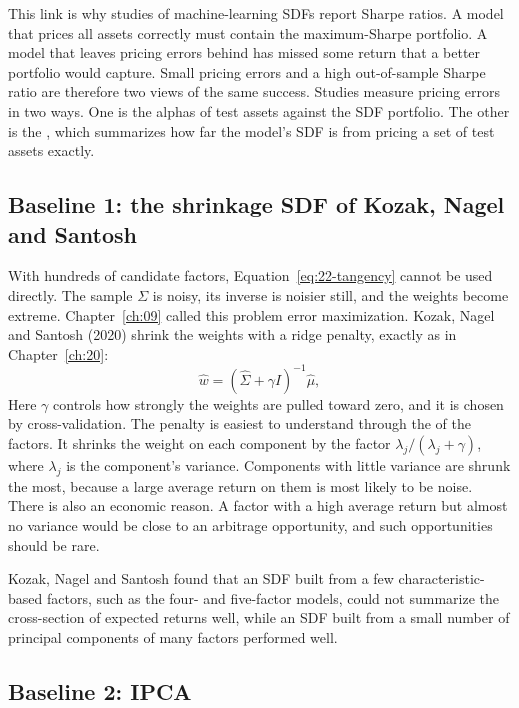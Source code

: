 This link is why studies of machine-learning SDFs report Sharpe ratios. A model that prices all assets correctly must contain the maximum-Sharpe portfolio. A model that leaves pricing errors behind has missed some return that a better portfolio would capture. Small pricing errors and a high out-of-sample Sharpe ratio are therefore two views of the same success. Studies measure pricing errors in two ways. One is the alphas of test assets against the SDF portfolio. The other is the , which summarizes how far the model's SDF is from pricing a set of test assets exactly.

\subsection{Baseline 1: the shrinkage SDF of Kozak, Nagel and Santosh}

With hundreds of candidate factors, Equation~\eqref{eq:22-tangency} cannot be used directly. The sample $\Sigma$ is noisy, its inverse is noisier still, and the weights become extreme. Chapter~\ref{ch:09} called this problem error maximization. Kozak, Nagel and Santosh (2020) shrink the weights with a ridge penalty, exactly as in Chapter~\ref{ch:20}:
\begin{equation}
  \hat w = \left(\hat\Sigma + \gamma I\right)^{-1} \hat\mu,
  \label{eq:22-kns}
\end{equation}
Here $\gamma$ controls how strongly the weights are pulled toward zero, and it is chosen by cross-validation. The penalty is easiest to understand through the  of the factors. It shrinks the weight on each component by the factor $\lambda_j/(\lambda_j+\gamma)$, where $\lambda_j$ is the component's variance. Components with little variance are shrunk the most, because a large average return on them is most likely to be noise. There is also an economic reason. A factor with a high average return but almost no variance would be close to an arbitrage opportunity, and such opportunities should be rare.

Kozak, Nagel and Santosh found that an SDF built from a few characteristic-based factors, such as the four- and five-factor models, could not summarize the cross-section of expected returns well, while an SDF built from a small number of principal components of many factors performed well.

\subsection{Baseline 2: IPCA}

